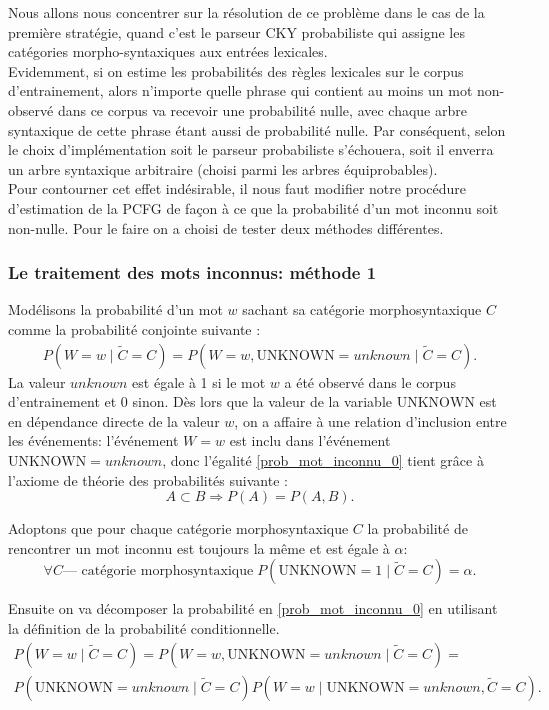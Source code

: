 \documentclass[12pt]{article}
\begin{document}
Nous allons nous concentrer sur la résolution de ce problème dans le cas de la
première stratégie, quand c'est le parseur CKY probabiliste qui assigne les
catégories morpho-syntaxiques aux entrées lexicales. \\

Evidemment, si on estime
les probabilités des règles lexicales sur le corpus d'entrainement, alors
n'importe quelle phrase qui contient au moins un mot non-observé dans ce corpus
va recevoir une probabilité nulle, avec chaque arbre syntaxique de cette phrase
étant aussi de probabilité nulle. Par conséquent, selon le choix
d'implémentation soit le parseur probabiliste s'échouera, soit il enverra un
arbre syntaxique arbitraire (choisi parmi les arbres équiprobables). \\

Pour contourner cet effet indésirable, il nous faut modifier notre procédure
d'estimation de la PCFG de façon à ce que la probabilité d'un mot inconnu
soit non-nulle. Pour le faire on a choisi de tester deux méthodes différentes.

\subsubsection{Le traitement des mots inconnus: m\'ethode 1}

Modélisons la probabilité d'un mot $w$ sachant sa catégorie morphosyntaxique
$C$ comme la probabilité conjointe suivante :
\begin{eqnarray}
\label{prob_mot_inconnu_0}
 P(W = w \mid \tilde{C} = C) = P(W = w, \mathrm{UNKNOWN} = unknown \mid \tilde{C} = C).
\end{eqnarray}
La valeur $unknown$ est égale à 1 si le mot $w$ a été observé dans le
corpus d'entrainement et 0 sinon. Dès lors que la valeur de la variable
$\mathrm{UNKNOWN}$ est en dépendance directe de la valeur $w$, on a affaire à
une relation d'inclusion entre les événements: l'événement $W = w$ est
inclu dans l'événement $\mathrm{UNKNOWN} = unknown$, donc l'égalité
\ref{prob_mot_inconnu_0} tient grâce à l'axiome de théorie des probabilités
suivante :
$$ A \subset B \Rightarrow P(A) = P(A,B).$$

Adoptons que pour chaque catégorie morphosyntaxique $C$ la probabilité de
rencontrer un mot inconnu est toujours la même et est égale \`a $\alpha$:
$$ \forall C \text{--- cat\'egorie morphosyntaxique} \; P(\mathrm{UNKNOWN} = 1 \mid \tilde{C} = C) = \alpha.$$

Ensuite on va décomposer la probabilité en \ref{prob_mot_inconnu_0} en
utilisant la définition de la probabilité conditionnelle.
\begin{multline}
\label{prob_mot_inconnu_cond}
 P(W = w \mid \tilde{C} = C) = P(W = w, \mathrm{UNKNOWN} = unknown \mid \tilde{C} = C) = 
 \\
 P(\mathrm{UNKNOWN} = unknown \mid \tilde{C} = C) P(W = w \mid \mathrm{UNKNOWN} = unknown , \tilde{C} = C).
\end{multline}
\end{document}
